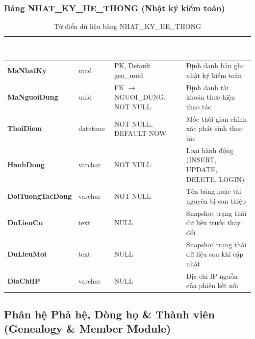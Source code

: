 \subsubsection{Bảng NHAT\_KY\_HE\_THONG (Nhật ký kiểm toán)}
\begin{table}[H]
\centering\small
\renewcommand{\arraystretch}{1.3}
\begin{tabularx}{\textwidth}{|>{\raggedright\arraybackslash\bfseries}p{3.2cm}|>{\raggedright\arraybackslash}p{2.3cm}|>{\raggedright\arraybackslash}p{3.2cm}|>{\raggedright\arraybackslash}X|}
\hline
\rowcolor{tableheader}
\textcolor{white}{\textbf{Tên thuộc tính}} & \textcolor{white}{\textbf{Kiểu vật lý}} & \textcolor{white}{\textbf{Ràng buộc}} & \textcolor{white}{\textbf{Ý nghĩa nghiệp vụ}} \\
\hline
MaNhatKy & uuid & PK, Default gen\_uuid & Định danh bản ghi nhật ký kiểm toán \\
\hline
MaNguoiDung & uuid & FK $\to$ NGUOI\_DUNG, NOT NULL & Định danh tài khoản thực hiện thao tác \\
\hline
ThoiDiem & datetime & NOT NULL, DEFAULT NOW & Mốc thời gian chính xác phát sinh thao tác \\
\hline
HanhDong & varchar & NOT NULL & Loại hành động (INSERT, UPDATE, DELETE, LOGIN) \\
\hline
DoiTuongTacDong & varchar & NOT NULL & Tên bảng hoặc tài nguyên bị can thiệp \\
\hline
DuLieuCu & text & NULL & Snapshot trạng thái dữ liệu trước thay đổi \\
\hline
DuLieuMoi & text & NULL & Snapshot trạng thái dữ liệu sau khi cập nhật \\
\hline
DiaChiIP & varchar & NULL & Địa chỉ IP nguồn của phiên kết nối \\
\hline
\end{tabularx}
\caption{Từ điển dữ liệu bảng NHAT\_KY\_HE\_THONG}
\label{tab:dict_nhat_ky}
\end{table}

\subsection{Phân hệ Phả hệ, Dòng họ \& Thành viên (Genealogy \& Member Module)}

